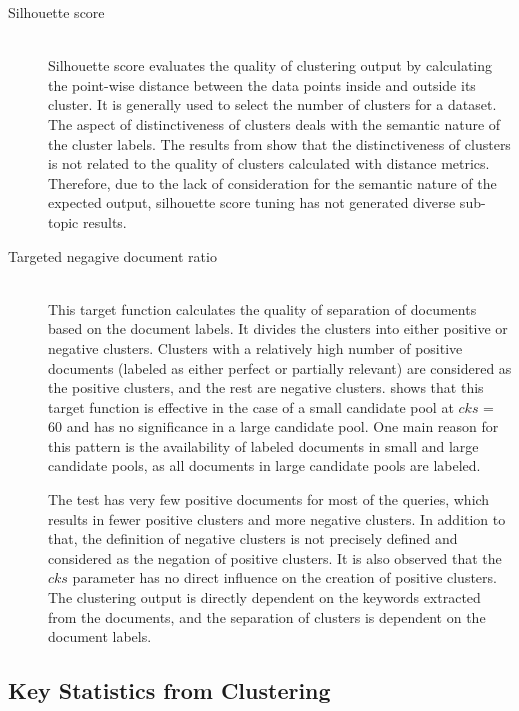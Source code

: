  \begin{description}
 	\item[Silhouette score]  \hfill \\ 
Silhouette score evaluates the quality of clustering output by calculating the point-wise distance between the data points inside and outside its cluster. It is generally used to select the number of clusters for a dataset. The aspect of distinctiveness of clusters deals with the semantic nature of the cluster labels. The results from  show that the distinctiveness of clusters is not related to the quality of clusters calculated with distance metrics. Therefore, due to the lack of consideration for the semantic nature of the expected output, silhouette score tuning has not generated diverse sub-topic results.
 	
 	\item[Targeted negagive document ratio]  \hfill \\ 
This target function calculates the quality of separation of documents based on the document labels. It divides the clusters into either positive or negative clusters. Clusters with a relatively high number of positive documents (labeled as either perfect or partially relevant) are considered as the positive clusters, and the rest are negative clusters.  shows that this target function is effective in the case of a small candidate pool at $cks$ = 60 and has no significance in a large candidate pool. One main reason for this pattern is the availability of labeled documents in small and large candidate pools, as all documents in large candidate pools are labeled.
 	
 The test has very few positive documents for most of the queries, which results in fewer positive clusters and more negative clusters. In addition to that, the definition of negative clusters is not precisely defined and considered as the negation of positive clusters. It is also observed that the $cks$ parameter has no direct influence on the creation of positive clusters. The clustering output is directly dependent on the keywords extracted from the documents, and the separation of clusters is dependent on the document labels.
 	
 	
 	
 \end{description}
 
 	
\subsection{Key Statistics from Clustering}

